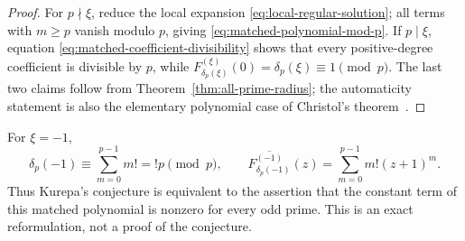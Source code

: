 \begin{proof}
For $p\nmid\xi$, reduce the local expansion
\eqref{eq:local-regular-solution}; all terms with $m\geq p$ vanish modulo
$p$, giving \eqref{eq:matched-polynomial-mod-p}.  If $p\mid\xi$, equation
\eqref{eq:matched-coefficient-divisibility} shows that every positive-degree
coefficient is divisible by $p$, while
$F_{\delta_p(\xi)}^{(\xi)}(0)=\delta_p(\xi)\equiv1\pmod p$.  The last two
claims follow from Theorem~\ref{thm:all-prime-radius}; the automaticity
statement is also the elementary polynomial case of Christol's
theorem~\cite{ChristolEtAl1980}.
\end{proof}

\begin{remark}
For $\xi=-1$,
\[
 \delta_p(-1)\equiv\sum_{m=0}^{p-1}m!=!p\pmod p,
 \qquad
 \overline{F_{\delta_p(-1)}^{(-1)}}(z)
 =\sum_{m=0}^{p-1}m!(z+1)^m.
\]
Thus Kurepa's conjecture is equivalent to the assertion that the constant
term of this matched polynomial is nonzero for every odd prime.  This is an
exact reformulation, not a proof of the conjecture.
\end{remark}

